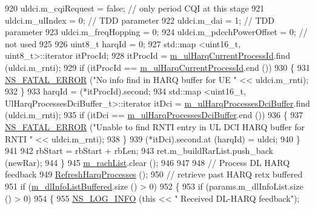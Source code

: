 \begin{DoxyCode}
920           uldci.m\_cqiRequest = \textcolor{keyword}{false}; \textcolor{comment}{// only period CQI at this stage}
921           uldci.m\_ulIndex = 0; \textcolor{comment}{// TDD parameter}
922           uldci.m\_dai = 1; \textcolor{comment}{// TDD parameter}
923           uldci.m\_freqHopping = 0;
924           uldci.m\_pdcchPowerOffset = 0; \textcolor{comment}{// not used}
925 
926           uint8\_t harqId = 0;
927           std::map <uint16\_t, uint8\_t>::iterator itProcId;
928           itProcId = \hyperlink{classns3_1_1CqaFfMacScheduler_a55974c35f8b783bb902ae8676fb6ff10}{m\_ulHarqCurrentProcessId}.find (uldci.m\_rnti);
929           \textcolor{keywordflow}{if} (itProcId == \hyperlink{classns3_1_1CqaFfMacScheduler_a55974c35f8b783bb902ae8676fb6ff10}{m\_ulHarqCurrentProcessId}.end ())
930             \{
931               \hyperlink{group__fatal_ga5131d5e3f75d7d4cbfd706ac456fdc85}{NS\_FATAL\_ERROR} (\textcolor{stringliteral}{"No info find in HARQ buffer for UE "} << uldci.m\_rnti);
932             \}
933           harqId = (*itProcId).second;
934           std::map <uint16\_t, UlHarqProcessesDciBuffer\_t>::iterator itDci = 
      \hyperlink{classns3_1_1CqaFfMacScheduler_a9af9c203c1b5fc43336988caf2294562}{m\_ulHarqProcessesDciBuffer}.find (uldci.m\_rnti);
935           \textcolor{keywordflow}{if} (itDci == \hyperlink{classns3_1_1CqaFfMacScheduler_a9af9c203c1b5fc43336988caf2294562}{m\_ulHarqProcessesDciBuffer}.end ())
936             \{
937               \hyperlink{group__fatal_ga5131d5e3f75d7d4cbfd706ac456fdc85}{NS\_FATAL\_ERROR} (\textcolor{stringliteral}{"Unable to find RNTI entry in UL DCI HARQ buffer for RNTI "} << 
      uldci.m\_rnti);
938             \}
939           (*itDci).second.at (harqId) = uldci;
940         \}
941       
942       rbStart = rbStart + rbLen;
943       ret.m\_buildRarList.push\_back (newRar);
944     \}
945   \hyperlink{classns3_1_1CqaFfMacScheduler_a8acbb79b06264ecc897614a20f77a3ad}{m\_rachList}.clear ();
946 
947 
948   \textcolor{comment}{// Process DL HARQ feedback}
949   \hyperlink{classns3_1_1CqaFfMacScheduler_a09c54657692d4e9d6c57185b1f16ad14}{RefreshHarqProcesses} ();
950   \textcolor{comment}{// retrieve past HARQ retx buffered}
951   \textcolor{keywordflow}{if} (\hyperlink{classns3_1_1CqaFfMacScheduler_aabc929a8c1c30338a5fa0826bb7cd2b8}{m\_dlInfoListBuffered}.size () > 0)
952     \{
953       \textcolor{keywordflow}{if} (params.m\_dlInfoList.size () > 0)
954         \{
955           \hyperlink{group__logging_gafbd73ee2cf9f26b319f49086d8e860fb}{NS\_LOG\_INFO} (\textcolor{keyword}{this} << \textcolor{stringliteral}{" Received DL-HARQ feedback"});

\end{DoxyCode}
